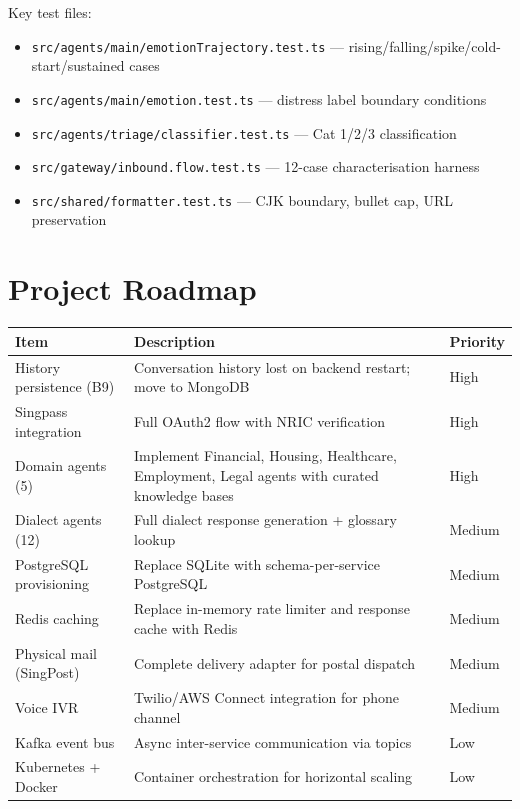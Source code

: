 \documentclass[12pt,a4paper]{article}
\begin{document}
Key test files:
\begin{itemize}[noitemsep]
  \item \texttt{src/agents/main/emotionTrajectory.test.ts} — rising/falling/spike/cold-start/sustained cases
  \item \texttt{src/agents/main/emotion.test.ts} — distress label boundary conditions
  \item \texttt{src/agents/triage/classifier.test.ts} — Cat 1/2/3 classification
  \item \texttt{src/gateway/inbound.flow.test.ts} — 12-case characterisation harness
  \item \texttt{src/shared/formatter.test.ts} — CJK boundary, bullet cap, URL preservation
\end{itemize}

\section{Project Roadmap}
\label{sec:roadmap}

\begin{longtable}{@{}lp{8cm}l@{}}
\toprule
\textbf{Item} & \textbf{Description} & \textbf{Priority} \\
\midrule
\endhead
History persistence (B9) & Conversation history lost on backend restart; move to MongoDB & High \\
Singpass integration & Full OAuth2 flow with NRIC verification & High \\
Domain agents (5) & Implement Financial, Housing, Healthcare, Employment, Legal agents with curated knowledge bases & High \\
Dialect agents (12) & Full dialect response generation + glossary lookup & Medium \\
PostgreSQL provisioning & Replace SQLite with schema-per-service PostgreSQL & Medium \\
Redis caching & Replace in-memory rate limiter and response cache with Redis & Medium \\
Physical mail (SingPost) & Complete delivery adapter for postal dispatch & Medium \\
Voice IVR & Twilio/AWS Connect integration for phone channel & Medium \\
Kafka event bus & Async inter-service communication via topics & Low \\
Kubernetes + Docker & Container orchestration for horizontal scaling & Low \\
\bottomrule
\end{longtable}
\end{document}
